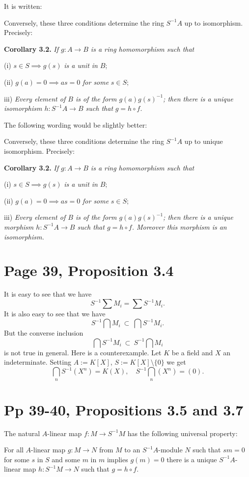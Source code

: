 \documentclass[parskip=half]{scrartcl}%
\begin{document}
It is written:

Conversely, these three conditions determine the ring $S^{-1}A$ up to isomorphism. Precisely:

\textbf{Corollary 3.2.} \emph{If $g:A\to B$ is a ring homomorphism such that}

(i) $s\in S\implies g(s)$ \emph{is a unit in} $B$;

(ii) $g(a)=0\implies as=0$ \emph{for some} $s\in S$;

iii) \emph{Every element of $B$ is of the form $g(a)g(s)^{-1}$; then there is a unique isomorphism $h:S^{-1}A\to B$ such that} $g=h\circ f$.

The following wording would be slightly better:

Conversely, these three conditions determine the ring $S^{-1}A$ up to unique isomorphism. Precisely:

\textbf{Corollary 3.2.} \emph{If $g:A\to B$ is a ring homomorphism such that}

(i) $s\in S\implies g(s)$ \emph{is a unit in} $B$;

(ii) $g(a)=0\implies as=0$ \emph{for some} $s\in S$;

iii) \emph{Every element of $B$ is of the form $g(a)g(s)^{-1}$; then there is a unique morphism $h:S^{-1}A\to B$ such that $g=h\circ f$. Moreover this morphism is an isomorphism.}

\section{Page 39, Proposition 3.4}%

It is easy to see that we have 
$$
S^{-1}\sum M_i=\sum S^{-1}M_i.
$$ 
It is also easy to see that we have 
$$
S^{-1}\bigcap M_i\ \subset\ \bigcap S^{-1}M_i.
$$ 
But the converse inclusion 
$$
\bigcap S^{-1}M_i\ \subset\ S^{-1}\bigcap M_i
$$ 
is not true in general. Here is a counterexample. Let $K$ be a field and $X$ an indeterminate. Setting $A:=K[X]$, $S:=K[X]\setminus\{0\}$ we get 
$$
\bigcap_n S^{-1}(X^n)=K(X),\quad S^{-1}\bigcap_n(X^n)=(0).
$$

\section{Pp 39-40, Propositions 3.5 and 3.7}%

The natural $A$-linear map $f:M\to S^{-1}M$ has the following universal property:

For all $A$-linear map $g:M\to N$ from $M$ to an $S^{-1}A$-module $N$ such that $sm=0$ for some $s$ in $S$ and some $m$ in $m$ implies $g(m)=0$ there is a unique $S^{-1}A$-linear map $h:S^{-1}M\to N$ such that $g=h\circ f$.
\end{document}
